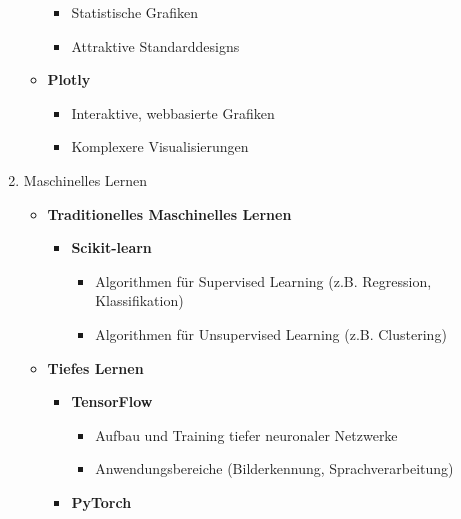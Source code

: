 \documentclass{vorlage-design-main}
\begin{document}
\begin{enumerate}
\begin{itemize}
\begin{itemize}
    \item
      Statistische Grafiken
    \item
      Attraktive Standarddesigns
    \end{itemize}
  \item
    \textbf{Plotly}

    \begin{itemize}
    
    \item
      Interaktive, webbasierte Grafiken
    \item
      Komplexere Visualisierungen
    \end{itemize}
  \end{itemize}
\item
  Maschinelles Lernen

  \begin{itemize}
  
  \item
    \textbf{Traditionelles Maschinelles Lernen}

    \begin{itemize}
    
    \item
      \textbf{Scikit-learn}

      \begin{itemize}
      
      \item
        Algorithmen für Supervised Learning (z.B. Regression,
        Klassifikation)
      \item
        Algorithmen für Unsupervised Learning (z.B. Clustering)
      \end{itemize}
    \end{itemize}
  \item
    \textbf{Tiefes Lernen}

    \begin{itemize}
    
    \item
      \textbf{TensorFlow}

      \begin{itemize}
      
      \item
        Aufbau und Training tiefer neuronaler Netzwerke
      \item
        Anwendungsbereiche (Bilderkennung, Sprachverarbeitung)
      \end{itemize}
    \item
      \textbf{PyTorch}


\end{itemize}
\end{itemize}
\end{enumerate}
\end{document}
